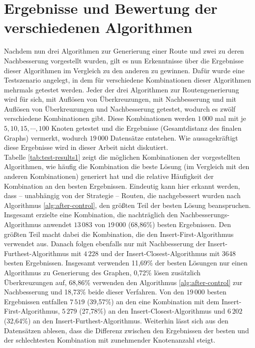 \section{Ergebnisse und Bewertung der verschiedenen Algorithmen}
Nachdem nun drei Algorithmen zur Generierung einer Route und zwei zu deren Nachbesserung vorgestellt wurden, gilt es nun Erkenntnisse über die Ergebnisse dieser Algorithmen im Vergleich zu den anderen zu gewinnen.
Dafür wurde eine Testszenario angelegt, in dem für verschiedene Kombinationen dieser Algorithmen mehrmals getestet werden.
Jeder der drei Algorithmen zur Routengenerierung wird für sich, mit Auflösen von Überkreuzungen, mit Nachbesserung und mit Auflösen von Überkreuzungen und Nachbesserung getestet, wodurch es zwölf verschiedene Kombinationen gibt.
Diese Kombinationen werden $1\,000$ mal mit je $5,10,15,\cdots,100$ Knoten getestet und die Ergebnisse (Gesamtdistanz des finalen Graphs) vermerkt, wodurch $19\,000$ Datensätze entstehen. Wie aussagekräftigt diese Ergebnisse wird in dieser Arbeit nicht diskutiert.
\\
Tabelle \vref{tab:test-results1} zeigt die möglichen Kombinationen der vorgestellten Algorithmen, wie häufig die Kombination die beste Lösung (im Vergleich mit den anderen Kombinationen) generiert hat und die relative Häufigkeit der Kombination an den besten Ergebnissen.
Eindeutig kann hier erkannt werden, dass -- unabhängig von der Strategie -- Routen, die nachgebessert wurden nach Algorithmus \vref{alg:after-control}, den größten Teil der besten Lösung beanspruchen.
Insgesamt erzielte eine Kombination, die nachträglich den Nachbesserungs-Algorithmus anwendet $13\,083$ von $19\,000$ (68,86\%) besten Ergebnissen.
Den größten Teil macht dabei die Kombination, die den Insert-First-Algorithmus verwendet aus.
Danach folgen ebenfalls nur mit Nachbesserung der Insert-Furthest-Algorithmus mit $4\,228$ und der Insert-Closest-Algorithmus mit 3648 besten Ergebnissen.
Insgesamt verwenden 11,69\% der besten Lösungen nur einen Algorithmus zu Generierung des Graphen, 0,72\% lösen zusätzlich Überkreuzungen auf, 68,86\% verwenden den Algorithmus \vref{alg:after-control} zur Nachbesserung und 18,73\% beide dieser Verfahren.
Von den $19\,000$ besten Ergebnissen entfallen $7\,519$ (39,57\%) an den eine Kombination mit dem Insert-First-Algorithmus, $5\,279$ (27,78\%) an den Insert-Closest-Algorithmus und $6\,202$ (32,64\%) an den Insert-Furthest-Algorithmus.
Weiterhin lässt sich aus den Datensätzen ablesen, dass die Differenz zwischen den Ergebnissen der besten und der schlechtesten Kombination mit zunehmender Knotenanzahl steigt.
